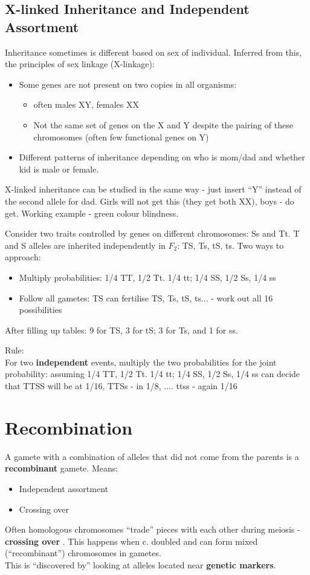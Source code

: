 \documentclass{scrartcl}
\begin{document}
\subsection{X-linked Inheritance and Independent Assortment}
\label{sec:2-6}
Inheritance sometimes is different based on sex of individual. Inferred from
this, the principles of sex linkage (X-linkage):
\begin{itemize}
\item Some genes are not present on two copies in all organisms:
  \begin{itemize}
  \item often males XY, females XX
  \item Not the same set of genes on the X and Y despite the pairing of these
    chromosomes (often few functional genes on Y)
  \end{itemize}
\item Different patterns of inheritance depending on who is mom/dad and whether
  kid is male or female.
\end{itemize}
X-linked inheritance can be studied in the same way - just insert ``Y'' instead of the second allele for dad. Girls will not get this (they get both XX), boys - do get. Working example - green colour blindness.

Consider two traits controlled by genes on different chromosomes: Ss and Tt. T and S alleles are inherited independently in $F_2$: TS, Ts, tS, ts. Two ways to approach:
\begin{itemize}
\item Multiply probabilities: 1/4 TT, 1/2 Tt. 1/4 tt; 1/4 SS, 1/2 Ss, 1/4 ss
\item Follow all gametes: TS can fertilise TS, Ts, tS, ts... - work out all 16
  possibilities
\end{itemize}
After filling up tables: 9 for TS, 3 for tS; 3 for Ts, and 1 for ss.


Rule:\\
For two {\bf independent } events, multiply the two probabilities for the joint probability: assuming 1/4 TT, 1/2 Tt. 1/4 tt; 1/4 SS, 1/2 Ss, 1/4 ss can decide that TTSS will be at 1/16, TTSs - in 1/8, .... ttss - again 1/16

\section{Recombination}
\label{sec:3-1}
A gamete with a combination of alleles that did not come from the parents is a
{\bf recombinant } gamete. Means:
\begin{itemize}
\item Independent assortment
\item Crossing over
\end{itemize}
Often homologous chromosomes ``trade'' pieces with each other during meiosis - {\bf crossing over }. This happens when c. doubled and can form mixed (``recombinant'') chromosomes in gametes.\\
This is ``discovered by'' looking at alleles located near {\bf genetic markers}.
\end{document}
